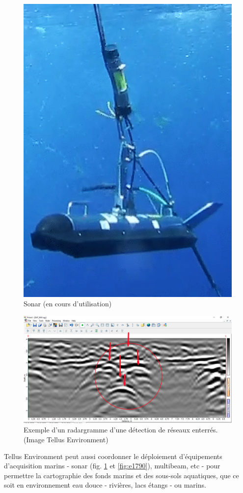 \documentclass[12pt,a4paper]{report}
\begin{document}
\begin{figure}
\begin{minipage}{.5\textwidth}
			\includegraphics[width=0.7\linewidth]{img/sonar}
			\caption[sonar]{Sonar (en cours d'utilisation)}
			\label{fig:sonar}
		\end{minipage}
	\end{figure}
	
	\begin{figure}
		\centering
		\includegraphics[width=0.7\linewidth]{img/radargram}
		\caption[radargramme]{Exemple d'un radargramme d'une détection \hspace{\textwidth} de réseaux enterrés. (Image Tellus Environment)}
		\label{fig:radargram}
	\end{figure}
	
	\para Tellus Environment peut aussi coordonner le déploiement d'équipements d'acquisition marins - sonar (fig. \ref{fig:sonar} et \ref{fig:e1790}), multibeam, etc - pour permettre la cartographie des fonds marins et des sous-sols aquatiques, que ce soit en environnement eau douce - rivières, lacs étangs - ou marins. 
	
\end{document}
